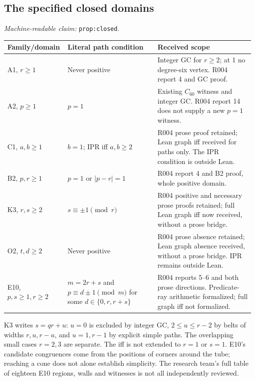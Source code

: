 \documentclass[11pt]{amsart}
\newcommand{\record}[1]{\nolinkurl{#1}}
\newcommand{\claimid}[1]{\par\nopagebreak\noindent\textit{Machine-readable claim:} \record{#1}.\par}
\theoremstyle{definition}\newtheorem{definition}{Definition}
\begin{document}
\subsection{The specified closed domains}\label{prop:closed}
\claimid{prop:closed}
\begin{center}\small
\begin{tabular}{p{}p{}p{}}\toprule
Family/domain & Literal path condition & Received scope\\\midrule
A1, $r\ge1$ & Never positive & Integer GC for $r\ge2$; at 1 no degree-six vertex. R004 report 4 and GC proof.\\
A2, $p\ge1$ & $p=1$ & Existing $C_{60}$ witness and integer GC. R004 report 14 does not supply a new $p=1$ witness.\\
C1, $a,b\ge1$ & $b=1$; IPR iff $a,b\ge2$ & R004 prose proof retained; Lean graph iff received for paths only. The IPR condition is outside Lean.\\
B2, $p,r\ge1$ & $p=1$ or $|p-r|=1$ & R004 report 4 and B2 proof, whole positive domain.\\
K3, $r,s\ge2$ & $s\equiv\pm1\pmod r$ & R004 positive and necessary prose proofs retained; full Lean graph iff now received, without a prose bridge.\\
O2, $t,d\ge2$ & Never positive & R004 prose absence retained; Lean graph absence received, without a prose bridge. IPR remains outside Lean.\\
E10, $p,s\ge1,r\ge2$ & $m=2r+s$ and $p\equiv d\pm1\pmod m$ for some $d\in\{0,r,r+s\}$ & R004 reports 5--6 and both prose directions. Predicate-ray arithmetic formalized; full graph iff not formalized.\\\bottomrule
\end{tabular}
\end{center}
K3 writes $s=qr+u$: $u=0$ is excluded by integer GC,
$2\le u\le r-2$ by belts of widths $r,u,r-u$, and $u=1,r-1$
by explicit simple paths. The overlapping small cases $r=2,3$ are
separate. The iff is not extended to $r=1$ or $s=1$. E10's candidate
congruences come from the positions of corners around the tube;
reaching a cone does not alone establish simplicity. The research
team's full table of eighteen E10 regions, walls and witnesses is not
all independently reviewed.
\end{document}
